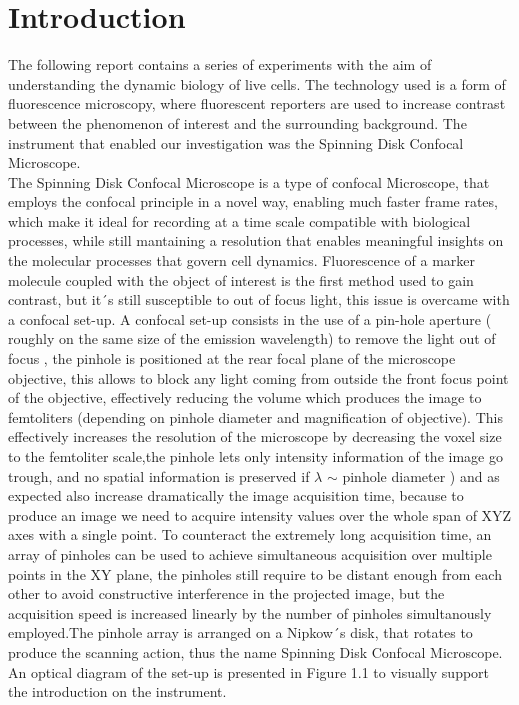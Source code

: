 \documentclass[a4paper,english,12pt,bibliography=totoc]{scrreprt}
\begin{document}
\chapter{Introduction}
\label{cha:Introduction}
The following report contains a series of experiments with the aim of understanding the dynamic biology of live cells.
The technology used is a form of fluorescence microscopy, where fluorescent reporters are used to increase contrast between the phenomenon of interest and the surrounding background. The instrument  that enabled our investigation was the Spinning Disk Confocal Microscope.\\
\newline
The Spinning Disk Confocal Microscope is a type of confocal Microscope, that employs the confocal principle in a novel way, enabling much faster frame rates, which make it ideal for recording at a time scale compatible with biological processes, while still mantaining a resolution that enables meaningful insights on the molecular processes that govern cell dynamics.
\newline
Fluorescence of a marker molecule coupled with the object of interest is the first method used to gain contrast, but it´s still susceptible to out of focus light, this issue is overcame with a confocal set-up.\newline
A confocal set-up consists in the use of a pin-hole aperture ( roughly on the same size of the emission wavelength) to remove the light out of focus \cite{confocal}, the pinhole is positioned at the rear focal plane of the microscope objective, this allows to block any light coming from outside the front focus point of the objective, effectively reducing the volume which produces the image to femtoliters (depending on pinhole diameter and magnification of objective). This effectively increases the resolution of the microscope by decreasing the voxel size to the femtoliter scale,the pinhole lets only intensity information of the image go trough, and no spatial information is preserved if $\lambda$ $\sim$ pinhole 
diameter )  and as expected also increase dramatically the image acquisition time, because to produce an image we need to acquire intensity values over the whole span of XYZ axes with a single point.\newline
To counteract the extremely long acquisition time, an array of pinholes can be used to achieve simultaneous acquisition over multiple points in the XY plane, the pinholes still require to be distant enough from each other to avoid constructive interference in the projected image, but the acquisition speed is increased linearly by the number of pinholes simultanously employed.The pinhole array is arranged on a Nipkow´s disk\cite{Spinning_disk}, that rotates to produce the scanning action, thus the name Spinning Disk Confocal Microscope.\\
\newline
An optical diagram of the set-up is presented in Figure 1.1 to visually support the introduction on the instrument.
\end{document}
